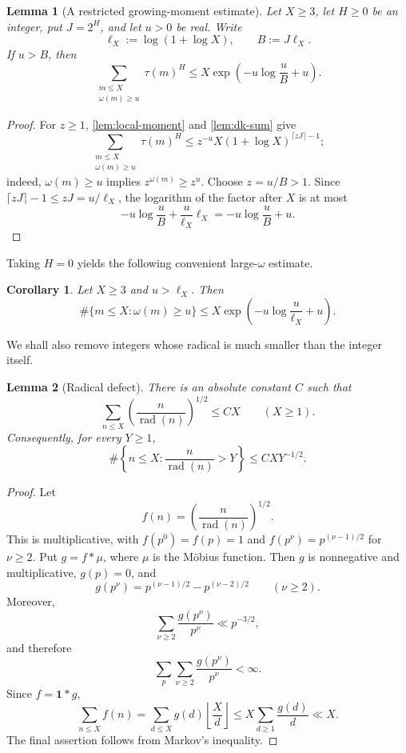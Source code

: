 \documentclass[11pt]{amsart}
\newtheorem{lemma}[lemma]{Lemma}
\newtheorem{corollary}[corollary]{Corollary}
\theoremstyle{definition}
\theoremstyle{remark}
\numberwithin{equation}{section}
\newcommand{\rad}{\operatorname{rad}}
\newcommand{\mathbfone}{\mathbf 1}
\begin{document}
\begin{lemma}[A restricted growing-moment estimate]\label{lem:restricted-moment}
Let $X\ge3$, let $H\ge0$ be an integer, put $J=2^H$, and let $u>0$ be
real.  Write
\[
 \ell_X:=\log(1+\log X),\qquad B:=J\ell_X.
\]
If $u>B$, then
\[
 \sum_{\substack{m\le X\\ \omega(m)\ge u}}\tau(m)^H
 \le X\exp\!\left(-u\log\frac uB+u\right).
\]
\end{lemma}

\begin{proof}
For $z\ge1$, \cref{lem:local-moment} and \cref{lem:dk-sum} give
\[
 \sum_{\substack{m\le X\\ \omega(m)\ge u}}\tau(m)^H
 \le z^{-u}X(1+\log X)^{\lceil zJ\rceil-1};
\]
indeed, $\omega(m)\ge u$ implies $z^{\omega(m)}\ge z^u$.  Choose
$z=u/B>1$.  Since $\lceil zJ\rceil-1\le zJ=u/\ell_X$, the logarithm of
the factor after $X$ is at most
\[
 -u\log\frac uB+\frac u{\ell_X}\ell_X
 =-u\log\frac uB+u.
\]
\end{proof}

Taking $H=0$ yields the following convenient large-$\omega$ estimate.

\begin{corollary}\label{cor:omega-tail}
Let $X\ge3$ and $u>\ell_X$.  Then
\[
 \#\{m\le X:\omega(m)\ge u\}
 \le X\exp\!\left(-u\log\frac u{\ell_X}+u\right).
\]
\end{corollary}

We shall also remove integers whose radical is much smaller than the integer itself.

\begin{lemma}[Radical defect]\label{lem:radical-defect}
There is an absolute constant $C$ such that
\[
 \sum_{n\le X}\left(\frac n{\rad(n)}\right)^{1/2}\le CX
 \qquad(X\ge1).
\]
Consequently, for every $Y\ge1$,
\[
 \#\left\{n\le X:\frac n{\rad(n)}>Y\right\}\le CXY^{-1/2}.
\]
\end{lemma}

\begin{proof}
Let
\[
 f(n)=\left(\frac n{\rad(n)}\right)^{1/2}.
\]
This is multiplicative, with $f(p^0)=f(p)=1$ and
$f(p^\nu)=p^{(\nu-1)/2}$ for $\nu\ge2$.  Put $g=f*\mu$, where $\mu$ is the M\"obius function.  Then $g$ is nonnegative and multiplicative, $g(p)=0$, and
\[
 g(p^\nu)=p^{(\nu-1)/2}-p^{(\nu-2)/2}\qquad(\nu\ge2).
\]
Moreover,
\[
 \sum_{\nu\ge2}\frac{g(p^\nu)}{p^\nu}\ll p^{-3/2},
\]
and therefore
\[
 \sum_p\sum_{\nu\ge2}\frac{g(p^\nu)}{p^\nu}<\infty.
\]
Since $f=\mathbfone*g$,
\[
 \sum_{n\le X}f(n)
 =\sum_{d\le X}g(d)\left\lfloor\frac Xd\right\rfloor
 \le X\sum_{d\ge1}\frac{g(d)}d\ll X.
\]
The final assertion follows from Markov's inequality.
\end{proof}
\end{document}
